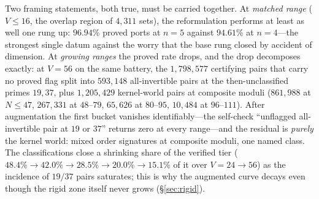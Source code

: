 \documentclass[11pt,a4paper]{article}
\numberwithin{equation}{section}
\theoremstyle{plain}
\theoremstyle{plain}
\theoremstyle{definition}
\theoremstyle{remark}
\begin{document}
\begin{center}
\end{center}

Two framing statements, both true, must be carried together. At
\emph{matched range} ($V\le 16$, the overlap region of $4{,}311$ sets),
the reformulation performs at least as well one rung up: $96.94\%$ proved
ports at $n=5$ against $94.61\%$ at $n=4$---the strongest single datum
against the worry that the base rung closed by accident of dimension. At
\emph{growing ranges} the proved rate drops, and the drop decomposes
exactly: at $V=56$ on the same battery, the $1{,}798{,}577$ certifying
pairs that carry no proved flag split into $593{,}148$
all-invertible pairs at the then-unclassified primes $19,37$, plus
$1{,}205{,}429$ kernel-world pairs at composite moduli
($861{,}988$ at $N\le47$, $267{,}331$ at $48$--$79$, $65{,}626$ at
$80$--$95$, $10{,}484$ at $96$--$111$). After augmentation the first bucket vanishes
identifiably---the self-check ``unflagged all-invertible pair at $19$ or
$37$'' returns zero at every range---and the residual is \emph{purely}
the kernel world: mixed order signatures at composite moduli, one named
class. The classifications close a shrinking share of the verified tier
($48.4\%\to42.0\%\to28.5\%\to20.0\%\to15.1\%$ of it over $V=24\to56$) as the
incidence of $19/37$ pairs saturates; this is why the augmented curve
decays even though the rigid zone itself never grows
(\S\ref{sec:rigid}).
\end{document}
